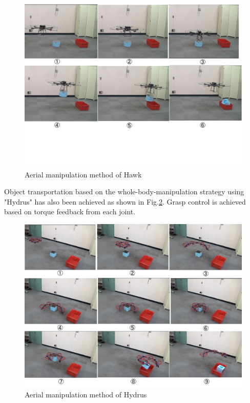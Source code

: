 \documentclass{standalone}
\begin{document}
\begin{figure}[h]
  \begin{center}
    \includegraphics[clip,  bb=0 110 720 540,  width=\columnwidth]{sections/task3/images/task3-tarrot810-manipulation.pdf}
    \caption{Aerial manipulation method of Hawk}
    \label{fig:task3-hawk-manipulation}
  \end{center}
\end{figure} 

Object transportation based on the whole-body-manipulation strategy using "Hydrus" has also been achieved as shown in Fig.\ref{fig:task3-hydrus-manipulation}. Grasp control is achieved based on torque feedback from each joint. 

\begin{figure}[h]
  \begin{center}
    \includegraphics[clip,  bb=0 0 720 540,  width=\columnwidth]{sections/task3/images/task3-hydrus-manipulation.pdf}
    \caption{Aerial manipulation method of Hydrus}
    \label{fig:task3-hydrus-manipulation}
  \end{center}
\end{figure} 
\end{document}
